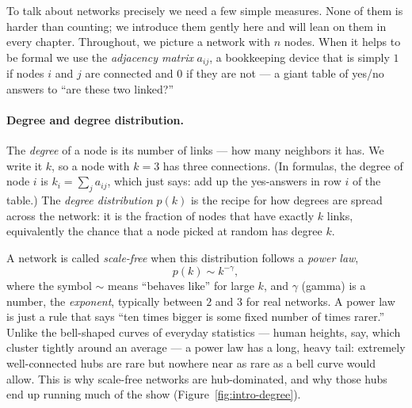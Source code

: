 To talk about networks precisely we need a few simple measures. None of them is
harder than counting; we introduce them gently here and will lean on them in
every chapter. Throughout, we picture a network with $n$ nodes. When it helps to
be formal we use the \emph{adjacency matrix} $a_{ij}$, a bookkeeping device that
is simply $1$ if nodes $i$ and $j$ are connected and $0$ if they are not --- a
giant table of yes/no answers to ``are these two linked?''

\paragraph{Degree and degree distribution.}
The \emph{degree} of a node is its number of links --- how many neighbors it has.
We write it $k$, so a node with $k=3$ has three connections. (In formulas, the
degree of node $i$ is $k_i = \sum_j a_{ij}$, which just says: add up the
yes-answers in row $i$ of the table.) The \emph{degree distribution} $p(k)$ is
the recipe for how degrees are spread across the network: it is the fraction of
nodes that have exactly $k$ links, equivalently the chance that a node picked at
random has degree $k$.

A network is called \emph{scale-free} when this distribution follows a
\emph{power law},
\begin{equation}
  p(k) \sim k^{-\gamma},
  \label{eq:intro-powerlaw}
\end{equation}
where the symbol $\sim$ means ``behaves like'' for large $k$, and $\gamma$
(gamma) is a number, the \emph{exponent}, typically between $2$ and $3$ for real
networks. A power law is just a rule that says ``ten times bigger is some fixed
number of times rarer.'' Unlike the bell-shaped curves of everyday statistics
--- human heights, say, which cluster tightly around an average --- a power law
has a long, heavy tail: extremely well-connected hubs are rare but nowhere near
as rare as a bell curve would allow. This is why scale-free networks are
hub-dominated, and why those hubs end up running much of the show
(Figure~\ref{fig:intro-degree}).

